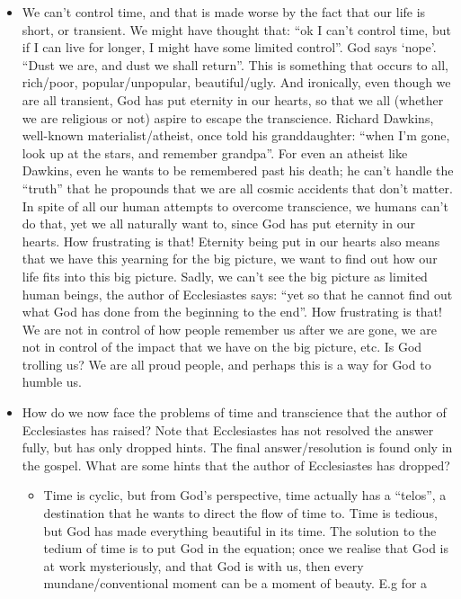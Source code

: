 \begin{itemize}
  \item{We can't control time, and that is made worse by the fact that our
  life is short, or transient.  We might have thought that: ``ok I can't
  control time, but if I can live for longer, I might have some limited
  control''.  God says `nope'.  ``Dust we are, and dust we shall return''.
  This is something that occurs to all, rich/poor, popular/unpopular,
  beautiful/ugly.  And ironically, even though we are all transient, God has
  put eternity in our hearts, so that we all (whether we are religious or
  not) aspire to escape the transcience.  Richard Dawkins, well-known
  materialist/atheist, once told his granddaughter: ``when I'm gone, look up
  at the stars, and remember grandpa''.  For even an atheist like Dawkins,
  even he wants to be remembered past his death; he can't handle the
  ``truth'' that he propounds that we are all cosmic accidents that don't
  matter.  In spite of all our human attempts to overcome transcience, we
  humans can't do that, yet we all naturally want to, since God has put
  eternity in our hearts.  How frustrating is that!  Eternity being put in
  our hearts also means that we have this yearning for the big picture, we
  want to find out how our life fits into this big picture.  Sadly, we can't
  see the big picture as limited human beings, the author of Ecclesiastes
  says: ``yet so that he cannot find out what God has done from the beginning
  to the end''.  How frustrating is that!  We are not in control of how
  people remember us after we are gone, we are not in control of the impact
  that we have on the big picture, etc.  Is God trolling us?  We are all
  proud people, and perhaps this is a way for God to humble us.}
  \item{How do we now face the problems of time and transcience that the
  author of Ecclesiastes has raised?  Note that Ecclesiastes has not resolved
  the answer fully, but has only dropped hints.  The final answer/resolution
  is found only in the gospel.  What are some hints that the author of
  Ecclesiastes has dropped?
  \begin{itemize}
    \item{Time is cyclic, but from God's perspective, time actually has a
    ``telos'', a destination that he wants to direct the flow of time to.
    Time is tedious, but God has made everything beautiful in its time.  The
    solution to the tedium of time is to put God in the equation; once we
    realise that God is at work mysteriously, and that God is with us, then
    every mundane/conventional moment can be a moment of beauty.  E.g for a
}
\end{itemize}}
\end{itemize}
